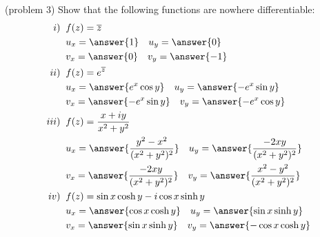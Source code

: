 \documentclass[handout]{ximera}
\begin{document}
\begin{problem}(problem 3)
Show that the following functions are nowhere differentiable:
\begin{align*}
i) \;\; & f(z) = \overline{z} \\
& u_x = \answer{1} \quad u_y = \answer{0} \\
& v_x = \answer{0} \quad v_y = \answer{-1} \\
ii) \;\; & f(z) = e^{\overline{z}} \\
& u_x = \answer{e^x \cos y} \quad u_y = \answer{-e^x \sin y} \\
& v_x = \answer{-e^x \sin y} \quad v_y = \answer{-e^x \cos y} \\
iii) \;\; & f(z) = \frac{x+iy}{x^2 + y^2} \\
& u_x = \answer{\frac{y^2 -x^2}{(x^2 +y^2)^2}} \quad u_y = \answer{\frac{-2xy}{(x^2 +y^2)^2}}\\
& v_x = \answer{\frac{-2xy}{(x^2 +y^2)^2}} \quad v_y = \answer{\frac{x^2 - y^2}{(x^2 +y^2)^2}} \\
iv) \;\; & f(z) = \sin x \cosh y - i \cos x \sinh y \\
& u_x = \answer{\cos x \cosh y} \quad u_y = \answer{\sin x \sinh y} \\ 
& v_x = \answer{\sin x \sinh y} \quad v_y = \answer{-\cos x \cosh y} 
\end{align*}
\end{problem}
\end{document}
